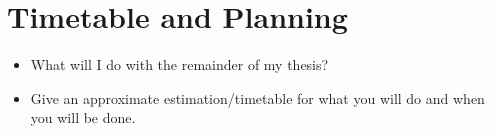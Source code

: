 \section{Timetable and Planning}
\begin{itemize}
    \item What will I do with the remainder of my thesis?
    \item Give an approximate estimation/timetable for what you will do and when you will be done.    
\end{itemize}